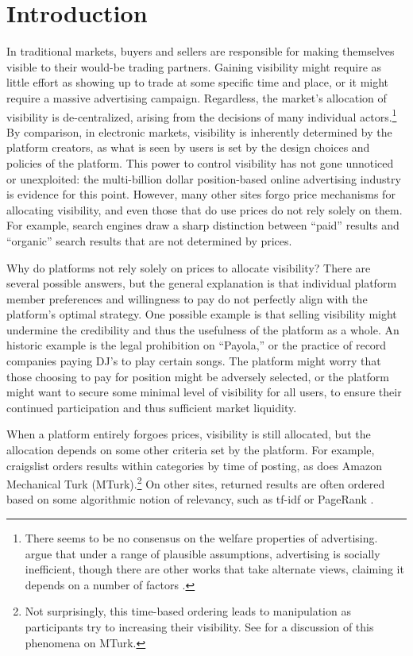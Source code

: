 \documentclass[prodmode,acmec]{acmsmall}
\begin{document}
\section{Introduction} 
In traditional markets, buyers and sellers are responsible for making
themselves visible to their would-be trading partners. Gaining
visibility might require as little effort as showing up to trade at
some specific time and place, or it might require a massive
advertising campaign. Regardless, the market's allocation of
visibility is de-centralized, arising from the decisions of many
individual actors.\footnote{There seems to be no consensus on the
  welfare properties of advertising. \cite{dixit1978advertising} argue
  that under a range of plausible assumptions, advertising is socially
  inefficient, though there are other works that take alternate views,
  claiming it depends on a number of factors \cite{becker1993simple}.}
By comparison, in electronic markets, visibility is inherently
determined by the platform creators, as what is seen by users is set
by the design choices and policies of the platform. This power to
control visibility has not gone unnoticed or unexploited: the
multi-billion dollar position-based online advertising industry
\cite{varian2007position,edelman2005internet} is evidence for this
point. However, many other sites forgo price mechanisms for allocating
visibility, and even those that do use prices do not rely solely on
them. For example, search engines draw a sharp distinction between
``paid'' results and ``organic'' search results that are not
determined by prices.

Why do platforms not rely solely on prices to allocate visibility?
There are several possible answers, but the general explanation is
that individual platform member preferences and willingness to pay do
not perfectly align with the platform's optimal strategy. One possible
example is that selling visibility might undermine the credibility and
thus the usefulness of the platform as a whole.  An historic example
is the legal prohibition on ``Payola,'' or the practice of record
companies paying DJ's to play certain songs. The platform might worry
that those choosing to pay for position might be adversely selected,
or the platform might want to secure some minimal level of visibility
for all users, to ensure their continued participation and thus
sufficient market liquidity.

When a platform entirely forgoes prices, visibility is still
allocated, but the allocation depends on some other criteria set by
the platform.  For example, craigslist orders results within
categories by time of posting, as does Amazon Mechanical Turk
(MTurk).\footnote{Not surprisingly, this time-based ordering leads to
  manipulation as participants try to increasing their visibility. See
  \cite{chilton2010task} for a discussion of this phenomena on MTurk.}
On other sites, returned results are often ordered based on some
algorithmic notion of relevancy, such as tf-idf or PageRank
\cite{page1999pagerank}.
\end{document}
